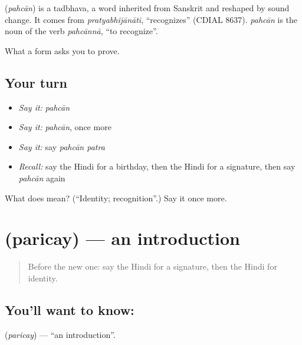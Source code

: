 \begin{cousinweb}
\textbf{} (\emph{pahcān}) is a tadbhava, a word inherited from Sanskrit and reshaped by sound change. It comes from \emph{pratyabhijānāti}, \textquotedblleft{}recognizes\textquotedblright{} (CDIAL 8637). \emph{pahcān} is the noun of the verb \emph{pahcānnā}, \textquotedblleft{}to recognize\textquotedblright{}.
\end{cousinweb}

\begin{grammarlens}[title={What you've built}]
What a form asks you to prove.
\end{grammarlens}

\subsection*{Your turn}
\begin{itemize}
\raggedright
  \item \emph{Say it:} \emph{pahcān}
  \item \emph{Say it:} \emph{pahcān}, once more
  \item \emph{Say it:} say \emph{pahcān patra}
  \item \emph{Recall:} say the Hindi for a birthday, then the Hindi for a signature, then say \emph{pahcān} again
\end{itemize}

\begin{tcolorbox}[breakable,colback=teal!4,colframe=teal!35!black,title={Before you move on}]
What does  mean? (\textquotedblleft{}Identity; recognition\textquotedblright{}.) Say it once more.
\end{tcolorbox}
\section[\texorpdfstring{\hi{परिचय} (paricay)}{परिचय (paricay)}]{ (paricay) — an introduction}

\label{lesson:HI-C120-parichay}



\begin{quote}
Before the new one: say the Hindi for a signature, then the Hindi for identity.
\end{quote}

\subsection*{You'll want to know: }
\textbf{} (\emph{paricay}) — \textquotedblleft{}an introduction\textquotedblright{}.

